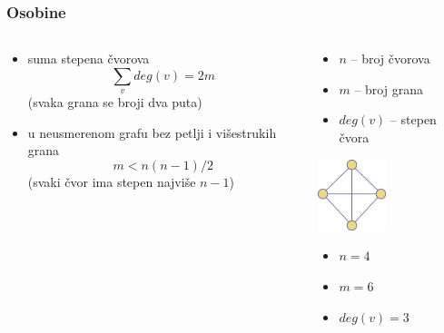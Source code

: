 \documentclass[compress]{beamer}
\begin{document}
\begin{frame}[fragile]
  \frametitle{Osobine}
  \begin{columns}
    \begin{column}[t]{7.5cm}
      \begin{itemize}
        \item suma stepena čvorova
        $$\sum_{v}deg(v)=2m$$
        (svaka grana se broji dva puta)
        \item u neusmerenom grafu bez petlji i višestrukih grana
        $$m < n(n-1)/2$$
        (svaki čvor ima stepen najviše $n-1$)
      \end{itemize}
    \end{column}
    \begin{column}[t]{4.5cm}
      \begin{itemize}
        \item $n$ -- broj čvorova
        \item $m$ -- broj grana
        \item $deg(v)$ -- stepen čvora
      \end{itemize}
      \begin{center}
        \includegraphics[width=2cm]{asp-14-pic07.png}
      \end{center}
      \begin{itemize}
        \item $n=4$
        \item $m=6$
        \item $deg(v)=3$
      \end{itemize}
    \end{column}
  \end{columns}
\end{frame}
\end{document}
